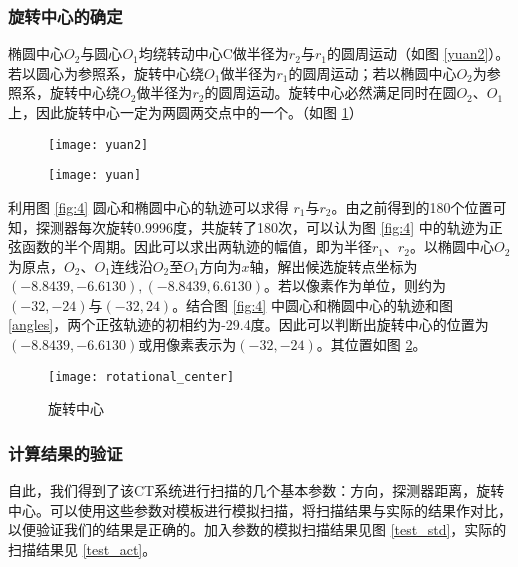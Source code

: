 \documentclass[withoutpreface,bwprint]{cumcmthesis} %
\begin{document}
    \subsubsection{旋转中心的确定}

      椭圆中心$O_2$与圆心$O_1$均绕转动中心C做半径为$r_2$与$r_1$的圆周运动（如图 \ref{yuan2}）。若以圆心为参照系，旋转中心绕$O_1$做半径为$r_1$的圆周运动；若以椭圆中心$O_2$为参照系，旋转中心绕$O_2$做半径为$r_2$的圆周运动。旋转中心必然满足同时在圆$O_2$、$O_1$上，因此旋转中心一定为两圆两交点中的一个。（如图 \ref{yuan}）

      \begin{figure}[!htbp]
        \begin{minipage}[t]{0.5\linewidth}
          \centering
          \texttt{[image: yuan2]}
          \caption{}
          \label{yuan2}
        \end{minipage}
        \begin{minipage}[t]{0.5\linewidth}
          \centering
          \texttt{[image: yuan]}
          \caption{}
          \label{yuan}
        \end{minipage}
      \end{figure}

      利用图 \ref{fig:4} 圆心和椭圆中心的轨迹可以求得 $r_1$与$r_2$。由之前得到的180个位置可知，探测器每次旋转0.9996度，共旋转了180次，可以认为图 \ref{fig:4} 中的轨迹为正弦函数的半个周期。因此可以求出两轨迹的幅值，即为半径$r_1$、$r_2$。以椭圆中心$O_2$为原点，$O_2$、$O_1$连线沿$O_2$至$O_1$方向为$x$轴，解出候选旋转点坐标为$(-8.8439, -6.6130),(-8.8439, 6.6130)$。若以像素作为单位，则约为$(-32,-24)$与$(-32,24)$。结合图 \ref{fig:4} 中圆心和椭圆中心的轨迹和图 \ref{angles}，两个正弦轨迹的初相约为-29.4度。因此可以判断出旋转中心的位置为$(-8.8439, -6.6130)$或用像素表示为$(-32,-24)$。其位置如图 \ref{rotate}。

      \begin{figure}[!htbp]
        \centering
        \texttt{[image: rotational\_center]}
        \caption{旋转中心}
        \label{rotate}
      \end{figure}

    \subsubsection{计算结果的验证}

      自此，我们得到了该CT系统进行扫描的几个基本参数：方向，探测器距离，旋转中心。可以使用这些参数对模板进行模拟扫描，将扫描结果与实际的结果作对比，以便验证我们的结果是正确的。加入参数的模拟扫描结果见图 \ref{test_std}，实际的扫描结果见 \ref{test_act}。
\end{document}
